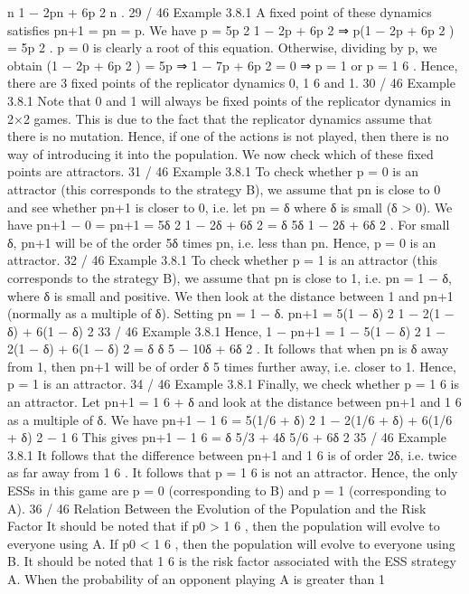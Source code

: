 \documentclass[]{report}
\begin{document}
n
1 − 2pn + 6p
2
n
.
29 / 46
Example 3.8.1
A fixed point of these dynamics satisfies pn+1 = pn = p. We have
p =
5p
2
1 − 2p + 6p
2 ⇒ p(1 − 2p + 6p
2
) = 5p
2
.
p = 0 is clearly a root of this equation. Otherwise, dividing by p,
we obtain
(1 − 2p + 6p
2
) = 5p ⇒ 1 − 7p + 6p
2 = 0 ⇒ p = 1 or p =
1
6
.
Hence, there are 3 fixed points of the replicator dynamics 0, 1
6
and
1.
30 / 46
Example 3.8.1
Note that 0 and 1 will always be fixed points of the replicator
dynamics in 2×2 games.
This is due to the fact that the replicator dynamics assume that
there is no mutation. Hence, if one of the actions is not played,
then there is no way of introducing it into the population.
We now check which of these fixed points are attractors.
31 / 46
Example 3.8.1
To check whether p = 0 is an attractor (this corresponds to the
strategy B), we assume that pn is close to 0 and see whether pn+1
is closer to 0, i.e. let pn = δ where δ is small (δ > 0).
We have
pn+1 − 0 = pn+1 =
5δ
2
1 − 2δ + 6δ
2
= δ
5δ
1 − 2δ + 6δ
2
.
For small δ, pn+1 will be of the order 5δ times pn, i.e. less than pn.
Hence, p = 0 is an attractor.
32 / 46
Example 3.8.1
To check whether p = 1 is an attractor (this corresponds to the
strategy B), we assume that pn is close to 1, i.e. pn = 1 − δ,
where δ is small and positive.
We then look at the distance between 1 and pn+1 (normally as a
multiple of δ). Setting pn = 1 − δ.
pn+1 =
5(1 − δ)
2
1 − 2(1 − δ) + 6(1 − δ)
2
33 / 46
Example 3.8.1
Hence,
1 − pn+1 = 1 −
5(1 − δ)
2
1 − 2(1 − δ) + 6(1 − δ)
2
= δ
δ
5 − 10δ + 6δ
2
.
It follows that when pn is δ away from 1, then pn+1 will be of order
δ
5
times further away, i.e. closer to 1.
Hence, p = 1 is an attractor.
34 / 46
Example 3.8.1
Finally, we check whether p =
1
6
is an attractor. Let pn+1 =
1
6 + δ
and look at the distance between pn+1 and 1
6
as a multiple of δ.
We have
pn+1 −
1
6
=
5(1/6 + δ)
2
1 − 2(1/6 + δ) + 6(1/6 + δ)
2
−
1
6
This gives
pn+1 −
1
6
= δ
5/3 + 4δ
5/6 + 6δ
2
35 / 46
Example 3.8.1
It follows that the difference between pn+1 and 1
6
is of order 2δ,
i.e. twice as far away from 1
6
.
It follows that p =
1
6
is not an attractor.
Hence, the only ESSs in this game are p = 0 (corresponding to B)
and p = 1 (corresponding to A).
36 / 46
Relation Between the Evolution of the Population and the
Risk Factor
It should be noted that if p0 >
1
6
, then the population will evolve
to everyone using A.
If p0 <
1
6
, then the population will evolve to everyone using B.
It should be noted that 1
6
is the risk factor associated with the ESS
strategy A. When the probability of an opponent playing A is
greater than 1
\end{document}
